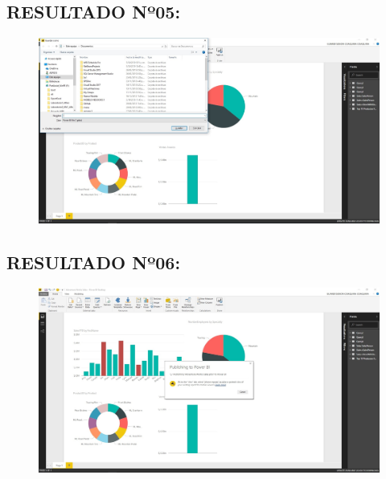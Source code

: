 \subsection{RESULTADO Nº05:}
\begin{figure}[httb]
\begin{center}
\includegraphics[width=15cm]{./Imagenes/Captura05}
\end{center}
\end{figure}

\subsection{RESULTADO Nº06:}
\begin{figure}[httb]
\begin{center}
\includegraphics[width=15cm]{./Imagenes/Captura06}
\end{center}
\end{figure}